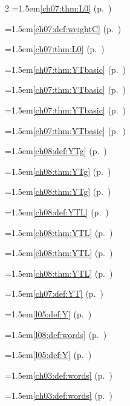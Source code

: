 \begin{multicols}{2}
\hangindent=1.5em\quad \ref{ch07:thm:L0} (p.~\pageref{ch07:thm:L0})\par
\hangindent=1.5em\quad \ref{ch07:def:weightC} (p.~\pageref{ch07:def:weightC})\par
\hangindent=1.5em\quad \ref{ch07:thm:L0} (p.~\pageref{ch07:thm:L0})\par
\hangindent=1.5em\quad \ref{ch07:thm:YTbasic} (p.~\pageref{ch07:thm:YTbasic})\par
\hangindent=1.5em\quad \ref{ch07:thm:YTbasic} (p.~\pageref{ch07:thm:YTbasic})\par
\hangindent=1.5em\quad \ref{ch07:thm:YTbasic} (p.~\pageref{ch07:thm:YTbasic})\par
\hangindent=1.5em\quad \ref{ch07:thm:YTbasic} (p.~\pageref{ch07:thm:YTbasic})\par
\hangindent=1.5em\quad \ref{ch08:def:YTg} (p.~\pageref{ch08:def:YTg})\par
\hangindent=1.5em\quad \ref{ch08:thm:YTg} (p.~\pageref{ch08:thm:YTg})\par
\hangindent=1.5em\quad \ref{ch08:thm:YTg} (p.~\pageref{ch08:thm:YTg})\par
\hangindent=1.5em\quad \ref{ch08:def:YTL} (p.~\pageref{ch08:def:YTL})\par
\hangindent=1.5em\quad \ref{ch08:thm:YTL} (p.~\pageref{ch08:thm:YTL})\par
\hangindent=1.5em\quad \ref{ch08:thm:YTL} (p.~\pageref{ch08:thm:YTL})\par
\hangindent=1.5em\quad \ref{ch08:thm:YTL} (p.~\pageref{ch08:thm:YTL})\par
\hangindent=1.5em\quad \ref{ch07:def:YT} (p.~\pageref{ch07:def:YT})\par
\hangindent=1.5em\quad \ref{l05:def:Y} (p.~\pageref{l05:def:Y})\par
\hangindent=1.5em\quad \ref{l08:def:words} (p.~\pageref{l08:def:words})\par
\hangindent=1.5em\quad \ref{l05:def:Y} (p.~\pageref{l05:def:Y})\par
\hangindent=1.5em\quad \ref{ch03:def:words} (p.~\pageref{ch03:def:words})\par
\hangindent=1.5em\quad \ref{ch03:def:words} (p.~\pageref{ch03:def:words})\par

\end{multicols}
